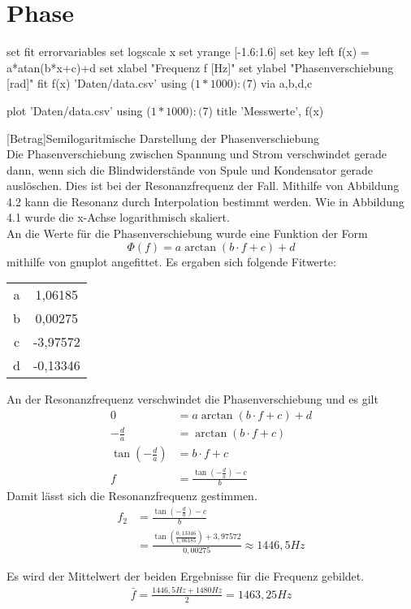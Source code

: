        \section{Phase}
   	\begin{gnuplot}[terminal=pdf,terminaloptions={font ",10" linewidth 2},scale=1.2]
    	set fit errorvariables
			set logscale x
            set yrange [-1.6:1.6]
            set key left
            f(x) = a*atan(b*x+c)+d
            set xlabel "Frequenz f [Hz]"
            set ylabel "Phasenverschiebung [rad]"
            fit f(x) 'Daten/data.csv' using ($1*1000):($7) via a,b,d,c
       
            plot 'Daten/data.csv' using ($1*1000):($7) title 'Messwerte', f(x)
        \end{gnuplot}
        [Betrag]{Semilogaritmische Darstellung der Phasenverschiebung}
        \ \\
        Die Phasenverschiebung zwischen Spannung und Strom verschwindet gerade dann, wenn sich die Blindwiderstände von Spule und Kondensator gerade auslöschen. Dies ist bei der Resonanzfrequenz der Fall. Mithilfe von Abbildung 4.2 kann die Resonanz durch Interpolation bestimmt werden. Wie in Abbildung 4.1 wurde die x-Achse logarithmisch skaliert.\\
        An die Werte für die Phasenverschiebung wurde eine Funktion der Form 
        \begin{equation}
        \Phi(f)=a \arctan(b\cdot f+c) + d 
        \end{equation}
        mithilfe von gnuplot angefittet. Es ergaben sich folgende Fitwerte: \\
        \begin{center}
        \begin{tabular}{c|c}
            a & 1,06185 \\
            b & 0,00275 \\
            c & -3,97572 \\
            d & -0,13346 
        \end{tabular}
        \end{center}
        An der Resonanzfrequenz verschwindet die Phasenverschiebung und es gilt 
        \begin{align}
        	0 &= a \arctan(b \cdot f+c) + d \\
            -\frac{d}{a} &=	\arctan(b \cdot f+c)\\
            \tan\left(-\frac{d}{a}\right) &= b\cdot f+c\\
            f &= \frac{\tan\left(-\frac{d}{a}\right) - c}{b}
        \end{align}
        Damit lässt sich die Resonanzfrequenz gestimmen.
        \begin{align}
        	f_2 &= \frac{\tan\left(-\frac{d}{a}\right) - c}{b} \\            &= \frac{\tan\left(\frac{0,13346}{1,06185}\right) + 3,97572}{0,00275} \approx 1446,5 Hz
        \end{align}
        
        Es wird der Mittelwert der beiden Ergebnisse für die Frequenz gebildet. 
        \begin{align}
        	\bar{f} = \frac{1446,5 Hz + 1480 Hz}{2} =  1463,25 Hz
        \end{align}
	\pagebreak